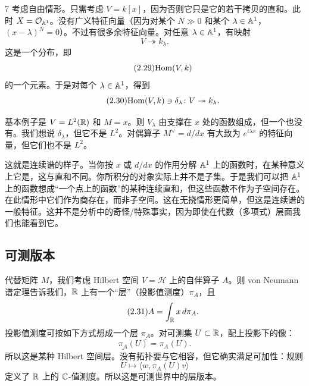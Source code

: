 \begin{srcex}{7}
考虑自由情形。只需考虑 $V=k[x]$，因为否则它只是它的若干拷贝的直和。此时 $X=\mathcal{O}_{\mathbb{A}^1}$。没有广义特征向量（因为对某个 $N\gg0$ 和某个 $\lambda\in\mathbb{A}^1$，$(x-\lambda)^N=0$）。不过有很多余特征向量。对任意 $\lambda\in\mathbb{A}^1$，有映射
\begin{equation}\tag{2.28}
V\twoheadrightarrow k_\lambda.
\end{equation}
这是一个分布，即
\begin{equation}\tag{2.29}
\mathrm{Hom}(V,k)
\end{equation}
的一个元素。于是对每个 $\lambda\in\mathbb{A}^1$，得到
\begin{equation}\tag{2.30}
\mathrm{Hom}(V,k)\ni\delta_\lambda\colon V\twoheadrightarrow k_\lambda.
\end{equation}
\end{srcex}

基本例子是 $V=L^2(\mathbb{R})$ 和 $M=x$。则 $V_\lambda$ 由支撑在 $x$ 处的函数组成，但一个也没有。我们想说 $\delta_\lambda$，但它不是 $L^2$。对偶算子 $M^{\vee}=d/dx$ 有大致为 $e^{i\lambda x}$ 的特征向量，但它们也不是 $L^2$。

这就是连续谱的样子。当你按 $x$ 或 $d/dx$ 的作用分解 $\mathbb{A}^1$ 上的函数时，在某种意义上它是，这与直和不同。你所积分的对象实际上并不是子集。于是我们可以把 $\mathbb{A}^1$ 上的函数想成“一个点上的函数”的某种连续直和，但这些函数不作为子空间存在。在此情形中它们作为商存在，而非子空间。这在无挠情形更简单，但这是连续谱的一般特征。这并不是分析中的奇怪/特殊事实，因为即使在代数（多项式）层面我们也能看到它。

\subsection{可测版本}

代替矩阵 $M$，我们考虑 Hilbert 空间 $V=\mathcal{H}$ 上的自伴算子 $A$。则 von Neumann 谱定理告诉我们，$\mathbb{R}$ 上有一个“层”（投影值测度）$\pi_A$，且
\begin{equation}\tag{2.31}
A=\int_{\mathbb{R}}x\,d\pi_A.
\end{equation}
投影值测度可按如下方式想成一个层 $\underline{\pi_A}$。对可测集 $U\subset\mathbb{R}$，配上投影下的像：
\begin{equation}\tag{2.32}
\underline{\pi_A}(U)=\pi_A(U).
\end{equation}
所以这是某种 Hilbert 空间层。没有拓扑要与它相容，但它确实满足可加性：规则
\begin{equation}\tag{2.33}
U\mapsto \langle w,\pi_A(U)v\rangle
\end{equation}
定义了 $\mathbb{R}$ 上的 $\mathbb{C}$-值测度。所以这是可测世界中的层版本。

